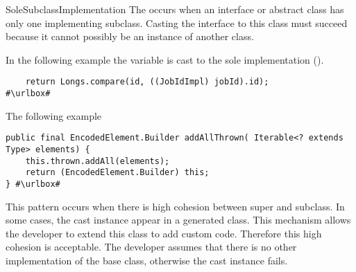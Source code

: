 \begin{pattern}{SoleSubclassImplementation}
The \thisp{} occurs when an interface or abstract class has only one implementing subclass.
Casting the interface to this class must succeed because it cannot possibly be an instance of another class.

\instances{}
In the following example%
\def\urlvar{http://bit.ly/ow2_proactive_scheduling_2Ulcjfs}
the  variable is cast to the sole implementation ().

\begin{verbatim}
    return Longs.compare(id, ((JobIdImpl) jobId).id);
#\urlbox#
\end{verbatim}

The following example%
\def\urlvar{http://bit.ly/immutables_immutables_2S4BoJs}

\begin{verbatim}
public final EncodedElement.Builder addAllThrown( Iterable<? extends Type> elements) {
    this.thrown.addAll(elements);
    return (EncodedElement.Builder) this;
} #\urlbox#
\end{verbatim}


\discussion{}
This pattern occurs when there is high cohesion between super and subclass.
In some cases, the cast instance appear in a generated class.
This mechanism allows the developer to extend this class to add custom code.
Therefore this high cohesion is acceptable.
The developer assumes that there is no other implementation of the base class,
otherwise the cast instance fails.

\end{pattern}
